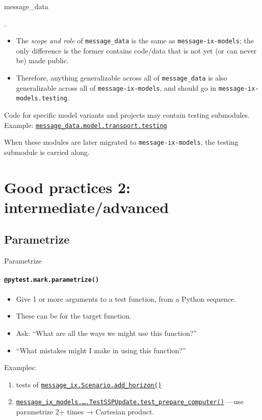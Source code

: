 \documentclass[12pt,aspectratio=169]{beamer}
\renewcommand{\mod}[1]{\texttt{#1}}
\newcommand{\func}[1]{\texttt{#1()}}
\begin{document}
\begin{frame}{\ttfamily message\_data}

\structure{\bfseries No \mod{.testing} module}.
\begin{itemize}
  \item The \emph{scope and role} of \mod{message_data} is the same as \mod{message-ix-models}; the only difference is the former contains code/data that is not yet (or can never be) made public.
  \item Therefore, anything generalizable across all of \mod{message_data} is also generalizable across all of \mod{message-ix-models}, and should go in \mod{message-ix-models.testing}.
\end{itemize}

\bigskip
Code for specific model variants and projects may contain testing submodules.
Example: \href{https://docs.messageix.org/projects/models-internal/en/latest/reference/model/_autosummary/message_data.model.transport.testing.html}{\mod{message_data.model.transport.testing}}

\bigskip
When these modules are later migrated to \mod{message-ix-models}, the testing submodule is carried along.
\end{frame}

\section{Good practices 2: intermediate/advanced}
\subsection{Parametrize}
\begin{frame}{Parametrize}
\framesubtitle{\texttt{@pytest.mark.parametrize()}}

\begin{itemize}
  \item Give 1 or more arguments to a test function, from a Python sequence.
  \item These can be  for the target function.
  \item Ask: “What are all the ways we might use this function?”
  \item “What mistakes might I make in using this function?”
\end{itemize}

\medskip
Examples:
\begin{enumerate}
  \item tests of
\href{https://github.com/iiasa/message_ix/blob/a488b8a/message_ix/tests/test_core.py\#L112-L205}{\func{message_ix.Scenario.add_horizon}}
  \item \href{https://github.com/iiasa/message-ix-models/blob/d985e5d/message_ix_models/tests/project/test_ssp.py\#L134-L158}{\func{message_ix_models.….TestSSPUpdate.test_prepare_computer}} —use parametrize 2+ times → Cartesian product.
\end{enumerate}

\end{frame}
\end{document}
